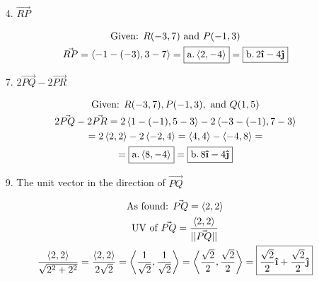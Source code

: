 \documentclass[10pt, letterpaper]{article}
\begin{document}
    \begin{itemize}
        \item [4.] $\vec{RP}$
        
        \begin{mdframed}
            \begin{equation*}
                \begin{gathered}
                    \text{Given: } R(-3,7) \text{ and } P(-1, 3)                \\
                    \vec{RP} =  \expval{-1 - (-3), 3 - 7} = \boxed{\text{a.} \expval{2, -4}} =
                                \boxed{\text{b.}\, 2 \ihat - 4 \jhat}
                \end{gathered}
            \end{equation*}
        \end{mdframed}
        
        \item [7.] $2\vec{PQ} - 2\vec{PR}$

        \begin{mdframed}
            \begin{equation*}
                \begin{gathered}
                    \text{Given: } R(-3,7), P(-1, 3), \text{ and } Q(1, 5)  \\
                    2\vec{PQ} - 2\vec{PR} = 
                    2\expval{1 - (-1), 5 - 3} - 2\expval{-3 - (-1), 7 - 3}  \\
                    = 2\expval{2, 2} - 2\expval{-2, 4} = 
                    \expval{4, 4} - \expval{-4, 8}  =                       \\
                    = \boxed{\text{a.} \expval{8, -4}} = \boxed{\text{b.}\, 8\ihat - 4\jhat}
                \end{gathered}
            \end{equation*}
        \end{mdframed}

        \item [9.] The unit vector in the direction of $\vec{PQ}$
        
        \begin{mdframed}
            \begin{equation*}
                \begin{gathered}
                    \text{As found: } \vec{PQ} = \expval{2, 2}                  \\
                    \text{UV of } \vec{PQ} = \frac{\expval{2, 2}}{||\vec{PQ}||} \\
                    \frac{\expval{2, 2}}{\sqrt{2^2 + 2^2}} 
                    = \frac{\expval{2, 2}}{2\sqrt{2}}
                    = \expval{\frac{1}{\sqrt{2}}, \frac{1}{\sqrt{2}}}
                    = \expval{\frac{\sqrt{2}}{2}, \frac{\sqrt{2}}{2}}
                    = \boxed{\frac{\sqrt{2}}{2}\ihat + \frac{\sqrt{2}}{2}\jhat}
                \end{gathered}
            \end{equation*}
        \end{mdframed}


\end{itemize}
\end{document}
